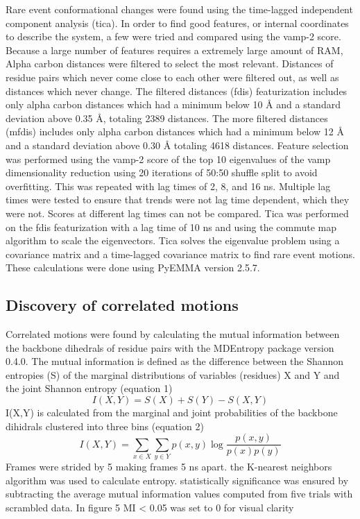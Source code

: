 \documentclass{biophys-new}
\begin{document}
Rare event conformational changes were found using the time-lagged independent component analysis (tica).\cite{perez2013identification,schwantes2013improvements} In order to find good features, or internal coordinates to describe the system, a few were tried and compared using the vamp-2 score. Because a large number of features requires a extremely large amount of RAM, Alpha carbon distances were filtered to select the most relevant. Distances of residue pairs which never come close to each other were filtered out, as well as distances which never change. The filtered distances (fdis) featurization includes only alpha carbon distances which had a minimum below 10 Å and a standard deviation above 0.35 Å, totaling 2389 distances. The more filtered distances (mfdis) includes only alpha carbon distances which had a minimum below 12 Å and a standard deviation above 0.30 Å totaling 4618 distances. Feature selection was performed using the vamp-2 score\cite{wu2020variational} of the top 10 eigenvalues of the vamp dimensionality reduction using 20 iterations of 50:50 shuffle split to avoid overfitting. This was repeated with lag times of 2, 8, and 16 ns. Multiple lag times were tested to ensure that trends were not lag time dependent, which they were not. Scores at different lag times can not be compared.\cite{husic2017note} Tica was performed on the fdis featurization with a lag time of 10 ns and using the commute map algorithm to scale the eigenvectors.\cite{noe2016commute} Tica solves the eigenvalue problem using a covariance matrix and a time-lagged covariance matrix to find rare event motions. These calculations were done using PyEMMA version 2.5.7. \cite{scherer2015pyemma}

\subsection*{Discovery of correlated motions}

Correlated motions were found by calculating the mutual information between the backbone dihedrals of residue pairs with the MDEntropy package version 0.4.0.\cite{mdentropy} The mutual information is defined as the difference between the Shannon entropies (S) of the marginal distributions of variables (residues) X and Y and the joint Shannon entropy (equation 1)
\begin{equation}
I(X, Y)=S(X)+S(Y)-S(X, Y)
\end{equation}
I(X,Y) is calculated from the marginal and joint probabilities of the backbone dihidrals clustered into three bins (equation 2)
\begin{equation}
I(X, Y)=\sum_{x \in X} \sum_{y \in Y} p(x, y) \log \frac{p(x, y)}{p(x) p(y)}
\end{equation}
Frames were strided by 5 making frames 5 ns apart. the K-nearest neighbors algorithm was used to calculate entropy. statistically significance was ensured by subtracting the average mutual information values computed from five trials with scrambled data. In figure 5 MI < 0.05 was set to 0 for visual clarity
\end{document}
